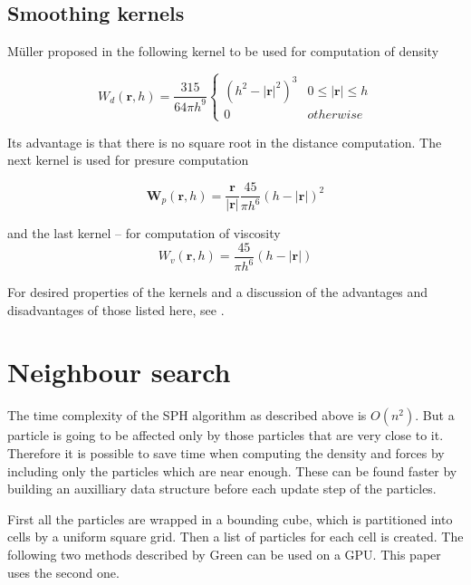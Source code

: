 \documentclass[a4paper,report]{IEEEtran}
\begin{document}
\subsection{Smoothing kernels}
Müller proposed in \cite{Articles:Muller} the following kernel to be used for computation of density 

\begin{equation}
	W_d(\mathbf{r},h) = \frac{315}{64\pi h^9}
	\left\{
		\begin{array}{ll}
			(h^2-|\mathbf{r}|^2)^3 	& 0\leq |\mathbf{r}| \leq h\\
			0 						& otherwise
		\end{array}
		\right.
\end{equation}

Its advantage is that there is no square root in the distance computation. The next kernel is used for presure computation

\begin{equation}
	\mathbf{W}_p(\mathbf{r},h) = \frac{\mathbf{r}}{|\mathbf{r}|} \frac{45}{\pi h^6} (h-|\mathbf{r}|)^2
\end{equation}

and the last kernel -- for computation of viscosity
\begin{equation}
	W_v(\mathbf{r},h) = \frac{45}{\pi h^6} (h-|\mathbf{r}|)
\end{equation}

For desired properties of the kernels and a discussion of the advantages and disadvantages of those listed here, see \cite{Articles:Morris}.

\section{Neighbour search}
The time complexity of the SPH algorithm as described above is $O(n^2)$. But a particle is going to be affected only by those particles that are very close to it. Therefore it is possible to save time when computing the density and forces by including only the particles which are near enough. These can be found faster by building an auxilliary data structure before each update step of the particles.

First all the particles are wrapped in a bounding cube, which is partitioned into cells by a uniform square grid. Then a list of particles for each cell is created. The following two methods described by Green \cite{Articles:Green} can be used on a GPU. This paper uses the second one.
\end{document}

